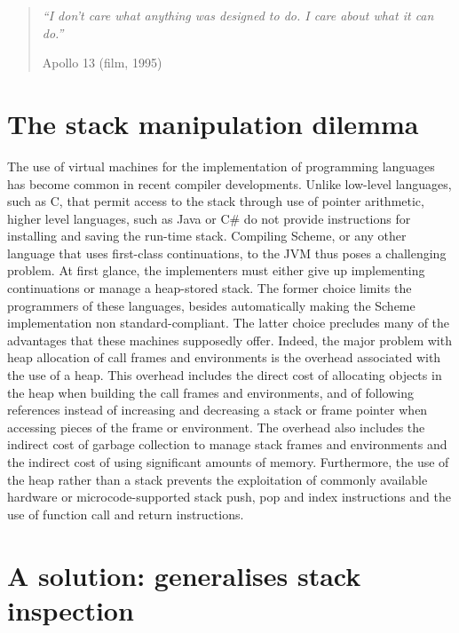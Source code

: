 \documentclass[12pt,a4paper,oneside,openright]{book}
\begin{document}
\begin{quote}
\emph{``I don't care what anything was designed to do. I care about what
it can do.''}

\begin{flushright}
Apollo 13 (film, 1995)
\end{flushright}
\end{quote}

\section{The stack manipulation
dilemma}\label{the-stack-manipulation-dilemma}

The use of virtual machines for the implementation of programming
languages has become common in recent compiler developments. Unlike
low-level languages, such as C, that permit access to the stack through
use of pointer arithmetic, higher level languages, such as Java or C\#
do not provide instructions for installing and saving the run-time
stack. Compiling Scheme, or any other language that uses first-class
continuations, to the JVM thus poses a challenging problem. At first
glance, the implementers must either give up implementing continuations
or manage a heap-stored stack. The former choice limits the programmers
of these languages, besides automatically making the Scheme
implementation non standard-compliant. The latter choice precludes many
of the advantages that these machines supposedly offer. Indeed, the
major problem with heap allocation of call frames and environments is
the overhead associated with the use of a heap. This overhead includes
the direct cost of allocating objects in the heap when building the call
frames and environments, and of following references instead of
increasing and decreasing a stack or frame pointer when accessing pieces
of the frame or environment. The overhead also includes the indirect
cost of garbage collection to manage stack frames and environments and
the indirect cost of using significant amounts of memory. Furthermore,
the use of the heap rather than a stack prevents the exploitation of
commonly available hardware or microcode-supported stack push, pop and
index instructions and the use of function call and return instructions.

\section{A solution: generalises stack
inspection}\label{a-solution-generalises-stack-inspection}
\end{document}
